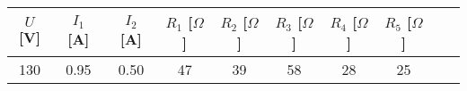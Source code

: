 \documentclass{article}
\begin{document}
\begin{tabular}{| c | c | c | c | c | c | c | c | c | c |}
  \hline
   $U$[V] & $I_1$ [A] & $I_2$ [A]& $R_{1}$ [$\Omega$]& $R_{2}$ [$\Omega$]& $R_{3}$ [$\Omega$]& $R_{4}$ [$\Omega$]& $R_{5}$ [$\Omega$]\\
  \hline
130 & 0.95 & 0.50 & 47 & 39 & 58 & 28 & 25
  \hline
\end{tabular}\\
\end{document}
